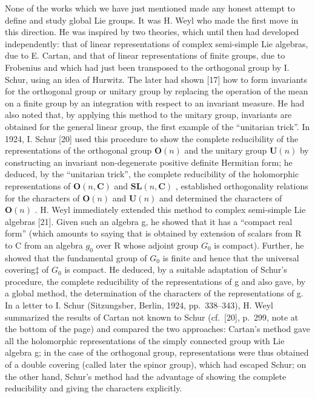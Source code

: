 None of the works which we have just mentioned made any honest attempt to define and study global Lie groups. It was H. Weyl who made the first move in this direction. He was inspired by two theories, which until then had developed independently: that of linear representations of complex semi-simple Lie algebras, due to E. Cartan, and that of linear representations of finite groups, due to Frobenius and which had just been transposed to the orthogonal group by I. Schur, using an idea of Hurwitz. The later had shown {[}17{]} how to form invariants for the orthogonal group or unitary group by replacing the operation of the mean on a finite group by an integration with respect to an invariant measure. He had also noted that, by applying this method to the unitary group, invariants are obtained for the general linear group, the first example of the ``unitarian trick''. In 1924, I. Schur {[}20{]} used this procedure to show the complete reducibility of the representations of the orthogonal group \(\mathbf{O}(n)\) and the unitary group \(\mathbf{U}(n)\) by constructing an invariant non-degenerate positive definite Hermitian form; he deduced, by the ``unitarian trick'', the complete reducibility of the holomorphic representations of \(\mathbf{O}(n,\mathbf{C})\) and \(\mathbf{SL}(n,\mathbf{C})\) , established orthogonality relations for the characters of \(\mathbf{O}(n)\) and \(\mathbf{U}(n)\) and determined the characters of \(\mathbf{O}(n)\) . H. Weyl immediately extended this method to complex semi-simple Lie algebras {[}21{]}. Given such an algebra g, he showed that it has a ``compact real form'' (which amounts to saying that is obtained by extension of scalars from R to C from an algebra \(g_{0}\) over R whose adjoint group \(G_{0}\) is compact). Further, he showed that the fundamental group of \(G_{0}\) is finite and hence that the universal covering‡ of \(G_{0}\) is compact. He deduced, by a suitable adaptation of Schur's procedure, the complete reducibility of the representations of g and also gave, by a global method, the determination of the characters of the representations of g. In a letter to I. Schur (Sitzungsber, Berlin, 1924, pp.~338--343), H. Weyl summarized the results of Cartan not known to Schur (cf.~{[}20{]}, p.~299, note at the bottom of the page) and compared the two approaches: Cartan's method gave all the holomorphic representations of the simply connected group with Lie algebra g; in the case of the orthogonal group, representations were thus obtained of a double covering (called later the spinor group), which had escaped Schur; on the other hand, Schur's method had the advantage of showing the complete reducibility and giving the characters explicitly.


